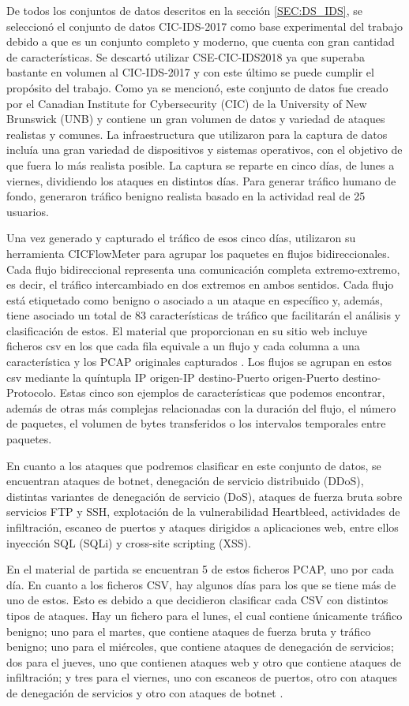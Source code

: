 De todos los conjuntos de datos descritos en la sección \ref{SEC:DS_IDS}, se seleccionó el conjunto de datos CIC-IDS-2017 como base experimental del trabajo debido a que es un conjunto completo y moderno, que cuenta con gran cantidad de características. Se descartó utilizar CSE-CIC-IDS2018 ya que superaba bastante en volumen al CIC-IDS-2017 y con este último se puede cumplir el propósito del trabajo.  Como ya se mencionó, este conjunto de datos fue creado por el Canadian Institute for Cybersecurity (CIC) de la University of New Brunswick (UNB) y contiene un gran volumen de datos y variedad de ataques realistas y comunes. La infraestructura que utilizaron para la captura de datos incluía una gran variedad de dispositivos y sistemas operativos, con el objetivo de que fuera lo más realista posible. La captura se reparte en cinco días, de lunes a viernes, dividiendo los ataques en distintos días. Para generar tráfico humano de fondo, generaron tráfico benigno realista basado en la actividad real de 25 usuarios.

Una vez generado y capturado el tráfico de esos cinco días, utilizaron su herramienta CICFlowMeter para agrupar los paquetes en flujos bidireccionales. Cada flujo bidireccional representa una comunicación completa extremo-extremo, es decir, el tráfico intercambiado en dos extremos en ambos sentidos. Cada flujo está etiquetado como benigno o asociado a un ataque en específico y, además, tiene asociado un total de 83 características de tráfico que facilitarán el análisis y clasificación de estos. El material que proporcionan en su sitio web incluye ficheros csv en los que cada fila equivale a un flujo y cada columna a una característica y los PCAP originales capturados \cite{cicids2017web}. Los flujos se agrupan en estos csv mediante la quíntupla IP origen-IP destino-Puerto origen-Puerto destino-Protocolo. Estas cinco son ejemplos de características que podemos encontrar, además de otras más complejas relacionadas con la duración del flujo, el número de paquetes, el volumen de bytes transferidos o los intervalos temporales entre paquetes.

En cuanto a los ataques que podremos clasificar en este conjunto de datos, se encuentran ataques de botnet, denegación de servicio distribuido (DDoS), distintas variantes de denegación de servicio (DoS), ataques de fuerza bruta sobre servicios FTP y SSH, explotación de la vulnerabilidad Heartbleed, actividades de infiltración, escaneo de puertos y ataques dirigidos a aplicaciones web, entre ellos inyección SQL (SQLi) y cross-site scripting (XSS).

En el material de partida se encuentran 5 de estos ficheros PCAP, uno por cada día. En cuanto a los ficheros CSV, hay algunos días para los que se tiene más de uno de estos. Esto es debido a que decidieron clasificar cada CSV con distintos tipos de ataques. Hay un fichero para el lunes, el cual contiene únicamente tráfico benigno; uno para el martes, que contiene ataques de fuerza bruta y tráfico benigno; uno para el miércoles, que contiene ataques de denegación de servicios; dos para el jueves, uno que contienen ataques web y otro que contiene ataques de infiltración; y tres para el viernes, uno con escaneos de puertos, otro con ataques de denegación de servicios y otro con ataques de botnet \cite{sharafaldin2018cicids2017}.